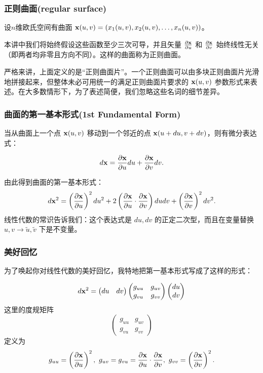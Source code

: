 \documentclass[CJK,13pt]{beamer}
\date{}
\begin{document}
  \bch
{}


\begin{frame}
  \frametitle{正则曲面(regular surface)}
  设$n$维欧氏空间有曲面 ${\mathbf{x}}(u, v) = \left(x_1(u, v), x_2(u, v), \ldots, x_n(u, v)\right)$。

  \skipline
  
  本讲中我们将始终假设这些函数至少三次可导，并且矢量 $\frac{\partial{\mathbf{x}}}{\partial u}$ 和 $\frac{\partial{\mathbf{x}}}{\partial v}$ 始终线性无关（即两者均非零且方向不同）。这样的曲面称为正则曲面。

  \skiplines

  {\scriptsize 严格来讲，上面定义的是“正则曲面片”。一个正则曲面可以由多块正则曲面片光滑地拼接起来，但整体未必可用统一的满足正则曲面片要求的 ${\mathbf{x}}(u,v)$ 参数形式来表述。在大多数情形下，为了表述简便，我们忽略这些名词的细节差异。}
\end{frame}

\begin{frame}
  \frametitle{曲面的第一基本形式(1st Fundamental Form)}
  当从曲面上一个点 ${\mathbf{x}}(u,v)$ 移动到一个邻近的点 ${\mathbf{x}}(u+du, v+dv)$，则有微分表达式：
  
  $$ d{\mathbf{x}} = \frac{\partial{\mathbf{x}}}{\partial u} du + \frac{\partial{\mathbf{x}}}{\partial v} dv. $$
  \emini
  \emini
  
  由此得到曲面的第一基本形式：
{\blue  $$d{\mathbf{x}}^2 = \left(\frac{\partial{\mathbf{x}}}{\partial u}\right)^2 du^2 +2\left(\frac{\partial{\mathbf{x}}}{\partial u}\cdot\frac{\partial{\mathbf{x}}}{\partial v}\right)du dv+ \left(\frac{\partial{\mathbf{x}}}{\partial v}\right)^2 dv^2.$$}
  线性代数的常识告诉我们：这个表达式是 $du, dv$ 的正定二次型，而且在变量替换 $u,v\rightarrow \tilde{u}, \tilde{v}$ 下是不变量。
\end{frame}


\begin{frame}
  \frametitle{美好回忆}
  为了唤起你对线性代数的美好回忆，我特地把第一基本形式写成了这样的形式：

  $$ d{\mathbf{x}}^2  =
  \begin{pmatrix}
    du &    dv
  \end{pmatrix}
  \begin{pmatrix}
    g_{uu} &   g_{uv} \\
    g_{vu} & g_{vv}
  \end{pmatrix}
  \begin{pmatrix}
    du \\
    dv
  \end{pmatrix}  
  $$
  这里的{\blue 度规矩阵}
  $$ \begin{pmatrix}
    g_{uu} &   g_{uv} \\
    g_{vu} & g_{vv}
  \end{pmatrix}
  $$
  定义为
  $$g_{uu}= \left(\frac{\partial{\mathbf{x}}}{\partial u}\right)^2,\ g_{uv} = g_{vu} = \frac{\partial{\mathbf{x}}}{\partial u}\cdot\frac{\partial{\mathbf{x}}}{\partial v},\ g_{vv} = \left(\frac{\partial{\mathbf{x}}}{\partial v}\right)^2.$$
  
\end{frame}
\end{document}
